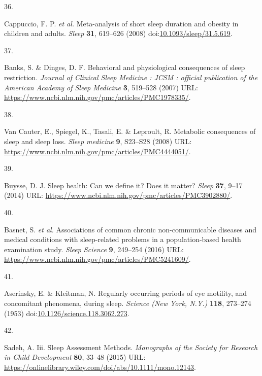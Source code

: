 \documentclass[
  10pt,
]{scrbook}
\newlength{\cslhangindent}
\newlength{\csllabelwidth}
\newlength{\cslentryspacingunit} %
\newenvironment{CSLReferences}[2] %
 {%
  \setlength{\parindent}{0pt}
  \ifodd #1
  \let\oldpar\par
  \def\par{\hangindent=\cslhangindent\oldpar}
  \fi
  \setlength{\parskip}{#2\cslentryspacingunit}
 }%
 {}
\newcommand{\CSLLeftMargin}[1]{\parbox[t]{\csllabelwidth}{#1}}
\newcommand{\CSLRightInline}[1]{\parbox[t]{\linewidth - \csllabelwidth}{#1}\break}
\let\originaltextbf\textbf
\renewcommand{\textbf}[1]{\textcolor{color1}{\originaltextbf{#1}}}
\begin{document}
\begin{CSLReferences}{0}{0}
\leavevmode{}%
\CSLLeftMargin{36. }%
\CSLRightInline{Cappuccio, F. P. \emph{et al.} Meta-analysis of short
sleep duration and obesity in children and adults. \emph{Sleep}
\textbf{31}, 619--626 (2008)
doi:\href{https://doi.org/10.1093/sleep/31.5.619}{10.1093/sleep/31.5.619}.}

\leavevmode{}%
\CSLLeftMargin{37. }%
\CSLRightInline{Banks, S. \& Dinges, D. F. Behavioral and physiological
consequences of sleep restriction. \emph{Journal of Clinical Sleep
Medicine : JCSM : official publication of the American Academy of Sleep
Medicine} \textbf{3}, 519--528 (2007) URL:
\url{https://www.ncbi.nlm.nih.gov/pmc/articles/PMC1978335/}.}

\leavevmode{}%
\CSLLeftMargin{38. }%
\CSLRightInline{Van Cauter, E., Spiegel, K., Tasali, E. \& Leproult, R.
Metabolic consequences of sleep and sleep loss. \emph{Sleep medicine}
\textbf{9}, S23--S28 (2008) URL:
\url{https://www.ncbi.nlm.nih.gov/pmc/articles/PMC4444051/}.}

\leavevmode{}%
\CSLLeftMargin{39. }%
\CSLRightInline{Buysse, D. J. Sleep health: Can we define it? Does it
matter? \emph{Sleep} \textbf{37}, 9--17 (2014) URL:
\url{https://www.ncbi.nlm.nih.gov/pmc/articles/PMC3902880/}.}

\leavevmode{}%
\CSLLeftMargin{40. }%
\CSLRightInline{Basnet, S. \emph{et al.} Associations of common chronic
non-communicable diseases and medical conditions with sleep-related
problems in a population-based health examination study. \emph{Sleep
Science} \textbf{9}, 249--254 (2016) URL:
\url{https://www.ncbi.nlm.nih.gov/pmc/articles/PMC5241609/}.}

\leavevmode{}%
\CSLLeftMargin{41. }%
\CSLRightInline{Aserinsky, E. \& Kleitman, N. Regularly occurring
periods of eye motility, and concomitant phenomena, during sleep.
\emph{Science (New York, N.Y.)} \textbf{118}, 273--274 (1953)
doi:\href{https://doi.org/10.1126/science.118.3062.273}{10.1126/science.118.3062.273}.}

\leavevmode{}%
\CSLLeftMargin{42. }%
\CSLRightInline{Sadeh, A. Iii. Sleep Assessment Methods.
\emph{Monographs of the Society for Research in Child Development}
\textbf{80}, 33--48 (2015) URL:
\url{https://onlinelibrary.wiley.com/doi/abs/10.1111/mono.12143}.}


\end{CSLReferences}
\end{document}
